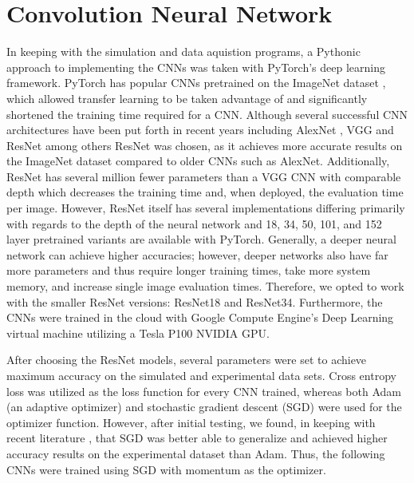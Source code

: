 \documentclass[10pt,journal,compsoc]{IEEEtran}
\begin{document}
\section*{Convolution Neural Network}
In keeping with the simulation and data aquistion programs, a Pythonic approach to implementing the CNNs was taken with PyTorch's \cite{pytorch} deep learning framework. PyTorch has popular CNNs pretrained on the ImageNet dataset \cite{deng2009imagenet}, which allowed transfer learning \cite{yosinski2014transferable} to be taken advantage of and significantly shortened the training time required for a CNN. Although several successful CNN architectures have been put forth in recent years including AlexNet \cite{Krizhevsky2012}, VGG\cite{Simonyan2014} and ResNet \cite{He2016} among others \cite{huang2017densely, iandola2016squeezenet} ResNet was chosen, as it achieves more accurate results on the ImageNet dataset compared to older CNNs such as AlexNet. Additionally, ResNet has several million fewer parameters than a VGG CNN with comparable depth which decreases the training time and, when deployed, the evaluation time per image. However, ResNet itself has several implementations differing primarily with regards to the depth of the neural network and 18, 34, 50, 101, and 152 layer pretrained variants are available with PyTorch. Generally, a deeper neural network can achieve higher accuracies; however, deeper networks also have far more parameters and thus require longer training times, take more system memory, and increase single image evaluation times. Therefore, we opted to work with the smaller ResNet versions: ResNet18 and ResNet34. Furthermore, the CNNs were trained in the cloud with Google Compute Engine's Deep Learning virtual machine utilizing a Tesla P100 NVIDIA GPU. 

After choosing the ResNet models, several parameters were set to achieve maximum accuracy on the simulated and experimental data sets. Cross entropy loss was utilized as the loss function for every CNN trained, whereas both Adam \cite{kingma2014adam} (an adaptive optimizer) and stochastic gradient descent (SGD) were used for the optimizer function. However, after initial testing, we found, in keeping with recent literature \cite{wilson2017marginal}, that SGD was better able to generalize and achieved higher accuracy results on the experimental dataset than Adam. Thus, the following CNNs were trained using SGD with momentum as the optimizer. 
\end{document}
